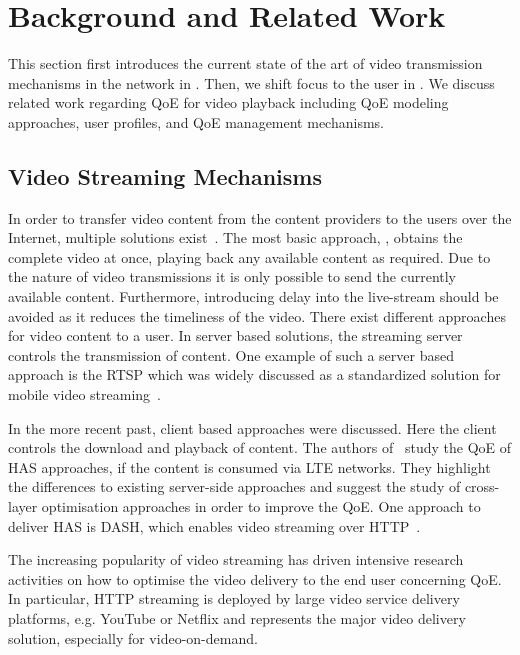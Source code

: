 \section{Background and Related Work}\label{sec:application:background}
This section first introduces the current state of the art of video transmission mechanisms in the network in .
Then, we shift focus to the user in .
We discuss related work regarding \gls{QoE} for video playback including \gls{QoE} modeling approaches, user profiles, and \gls{QoE} management mechanisms.

\subsection{Video Streaming Mechanisms}\label{sec:application:background:video_streaming_mechanisms}
In order to transfer video content from the content providers to the users over the Internet, multiple solutions exist~\cite{Begen2011}.
The most basic approach, \emph{\download}, obtains the complete video at once, playing back any available content as required.
Due to the nature of \emph{\live} video transmissions it is only possible to send the currently available content.
Furthermore, introducing delay into the live-stream should be avoided as it reduces the timeliness of the video.
There exist different approaches for \emph{\streaming} video content to a user.
In server based solutions, the streaming server controls the transmission of content.
One example of such a server based approach is the \gls{RTSP} which was widely discussed as a standardized solution for mobile video streaming~\cite{Elsen2001}.

In the more recent past, client based approaches were discussed.
Here the client controls the download and playback of content.
The authors of~\cite{Oyman2012} study the \gls{QoE} of \gls{HAS} approaches, if the content is consumed via \gls{LTE} networks.
They highlight the differences to existing server-side approaches and suggest the study of cross-layer optimisation approaches in order to improve the \gls{QoE}.
One approach to deliver \gls{HAS} is \gls{DASH}, which enables video streaming over \gls{HTTP}~\cite{Sodagar2011}.

The increasing popularity of video streaming has driven intensive research activities on how to optimise the video delivery to the end user concerning \gls{QoE}.
In particular, \gls{HTTP} streaming is deployed by large video service delivery platforms, e.g. YouTube or Netflix and represents the major video delivery solution, especially for video-on-demand.

